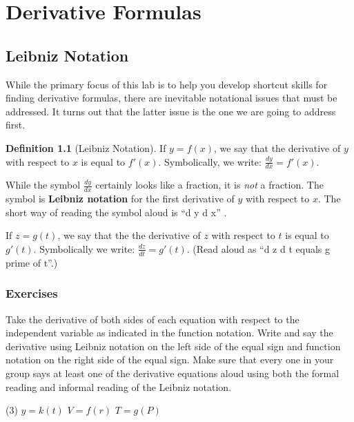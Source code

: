 \documentclass[10pt,oneside,]{book}
\newcommand{\terminology}[1]{\textbf{#1}}
\theoremstyle{plain}
\theoremstyle{definition}
\newtheorem{definition}[theorem]{Definition}
\numberwithin{equation}{section}
\newcommand{\fe}[2]{#1\mathopen{}\left(#2\right)\mathclose{}}
\newcommand{\fd}[1]{#1'}
\newcommand{\lz}[2]{\frac{d#1}{d#2}}
\begin{document}
\chapter[Derivative Formulas]{Derivative Formulas}\label{chapter-derivative-formulas}
\typeout{************************************************}
\typeout{************************************************}
\section[Leibniz Notation]{Leibniz Notation}\label{section-leibniz-notation}
While the primary focus of this lab is to help you develop shortcut skills for finding derivative formulas, there are inevitable notational issues that must be addressed.  It turns out that the latter issue is the one we are going to address first.%
\begin{definition}[Leibniz Notation]\label{definition-9}
If \(y=\fe{f}{x}\), we say that the derivative of \(y\) with respect to \(x\) is equal to \(\fe{\fd{f}}{x}\). Symbolically, we write: \(\lz{y}{x}=\fe{\fd{f}}{x}\).%
\par
While the symbol \(\lz{y}{x}\) certainly looks like a fraction, it is \emph{not} a fraction.  The symbol is \terminology{Leibniz notation} for the first derivative of \(y\) with respect to \(x\).  The short way of reading the symbol aloud is ``d y d x''%
.

            \par
If \(z=\fe{g}{t}\), we say that the the derivative of \(z\) with respect to \(t\) is equal to \(\fe{\fd{g}}{t}\).  Symbolically we write: \(\lz{z}{t}=\fe{\fd{g}}{t}\). (Read aloud as ``d z d t equals g prime of t''.)%
\end{definition}
\typeout{************************************************}
\typeout{************************************************}
\subsection[Exercises]{Exercises}\label{exercises-31}
Take the derivative of both sides of each equation with respect to the independent variable as indicated in the function notation.  Write and say the derivative using Leibniz notation on the left side of the equal sign and function notation on the right side of the equal sign.  Make sure that every one in your group says at least one of the derivative equations aloud using both the formal reading and informal reading of the Leibniz notation.%
\par
\begin{exercisegroup}(3)
\exercise[1.]\hypertarget{exercise-345}{\null}\(y=\fe{k}{t}\)%
\exercise[2.]\hypertarget{exercise-346}{\null}\(V=\fe{f}{r}\)%
\exercise[3.]\hypertarget{exercise-347}{\null}\(T=\fe{g}{P}\)%
\end{exercisegroup}
\par\smallskip\noindent
\typeout{************************************************}
\typeout{************************************************}
\end{document}
